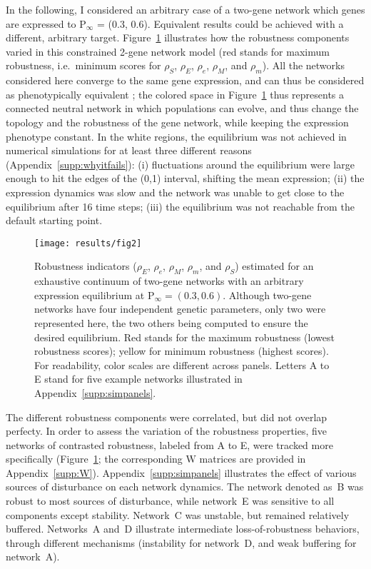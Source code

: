 \documentclass[10pt,a4paper]{article}
\newcommand{\stability}{{\rho_S}}
\newcommand{\earlyenv}{{\rho_E}}
\newcommand{\lateenv}{{\rho_e}}
\newcommand{\earlymut}{{\rho_M}}
\newcommand{\latemut}{{\rho_m}}
\newcommand{\W}{\bm{\mathrm W}}
\newcommand{\Pp}{\bm{\mathrm P}}
\newcommand{\SupMat}{Appendix~}
\begin{document}
In the following, I considered an arbitrary case of a two-gene network which genes are expressed to $\Pp_\infty$ = (0.3, 0.6). Equivalent results could be achieved with a different, arbitrary target. Figure~\ref{fig:imgpanels} illustrates how the robustness components varied in this constrained 2-gene network model (red stands for maximum robustness, i.e.\ minimum scores for $\stability$, $\earlyenv$, $\lateenv$, $\earlymut$, and $\latemut$). All the networks considered here converge to the same gene expression, and can thus be considered as phenotypically equivalent ; the colored space in Figure~\ref{fig:imgpanels} thus represents a connected neutral network in which populations can evolve, and thus change the topology and the robustness of the gene network, while keeping the expression phenotype constant. In the white regions, the equilibrium was not achieved in numerical simulations for at least three different reasons (\SupMat \ref{supp:whyitfails}): (i) fluctuations around the equilibrium were large enough to hit the edges of the (0,1) interval, shifting the mean expression; (ii) the expression dynamics was slow and the network was unable to get close to the equilibrium after 16 time steps; (iii) the equilibrium was not reachable from the default starting point.

\begin{figure}[t]
\begin{adjustwidth}{-1.5in}{0in}
\begin{flushright}
\texttt{[image: results/fig2]}
\caption{\color{Gray} \label{fig:imgpanels} Robustness indicators ($\earlyenv$, $\lateenv$, $\earlymut$, $\latemut$, and $\stability$) estimated for an exhaustive continuum of two-gene networks with an arbitrary expression equilibrium at $\Pp_\infty = (0.3, 0.6)$. Although two-gene networks have four independent genetic parameters, only two were represented here, the two others being computed to ensure the desired equilibrium. Red stands for the maximum robustness (lowest robustness scores); yellow for minimum robustness (highest scores). For readability, color scales are different across panels. Letters A to E stand for five example networks illustrated in \SupMat \ref{supp:simpanels}.}
\end{flushright}\end{adjustwidth}
\end{figure}

The different robustness components were correlated, but did not overlap perfecty. In order to assess the variation of the robustness properties, five networks of contrasted robustness, labeled from A to E, were tracked more specifically (Figure~\ref{fig:imgpanels}; the corresponding $\W$ matrices are provided in \SupMat \ref{supp:W}). \SupMat \ref{supp:simpanels} illustrates the effect of various sources of disturbance on each network dynamics. The network denoted as~B was robust to most sources of disturbance, while network~E was sensitive to all components except stability. Network~C was unstable, but remained relatively buffered. Networks~A and~D illustrate intermediate loss-of-robustness behaviors, through different mechanisms (instability for network~D, and weak buffering for network~A). 
\end{document}
